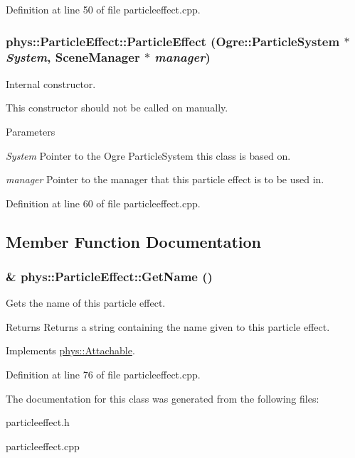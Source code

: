 Definition at line 50 of file particleeffect.cpp.

\hypertarget{classphys_1_1ParticleEffect_a112c7e4b2ec7c34c3aba3bd422ef8a1c}{
\subsubsection[{ParticleEffect}]{\setlength{\rightskip}{0pt plus 5cm}phys::ParticleEffect::ParticleEffect (Ogre::ParticleSystem $\ast$ {\em System}, \/  {\bf SceneManager} $\ast$ {\em manager})}}
\label{d2/d69/classphys_1_1ParticleEffect_a112c7e4b2ec7c34c3aba3bd422ef8a1c}


Internal constructor. 

This constructor should not be called on manually. 
\begin{DoxyParams}{Parameters}
\item[{\em System}]Pointer to the Ogre ParticleSystem this class is based on. \item[{\em manager}]Pointer to the manager that this particle effect is to be used in. \end{DoxyParams}


Definition at line 60 of file particleeffect.cpp.



\subsection{Member Function Documentation}
\hypertarget{classphys_1_1ParticleEffect_a0e1a6f5fe489fc6e82c91df50fdab3c4}{
\subsubsection[{GetName}]{ \& phys::ParticleEffect::GetName ()}}
\label{d2/d69/classphys_1_1ParticleEffect_a0e1a6f5fe489fc6e82c91df50fdab3c4}


Gets the name of this particle effect. 

\begin{DoxyReturn}{Returns}
Returns a string containing the name given to this particle effect. 
\end{DoxyReturn}


Implements \hyperlink{classphys_1_1Attachable_ad1a9bbd300fe21c5cc7e5aa7e2c95b85}{phys::Attachable}.



Definition at line 76 of file particleeffect.cpp.



The documentation for this class was generated from the following files:\begin{DoxyCompactItemize}
\item 
particleeffect.h\item 
particleeffect.cpp\end{DoxyCompactItemize}
